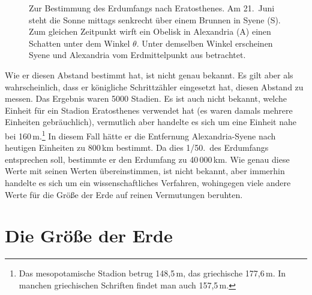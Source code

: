\begin{SCfigure}[30][htb]
\caption{\label{fig_Erat}%
Zur Bestimmung des Erdumfangs nach Eratosthenes. Am 21.\ Juni steht die Sonne
mittags senkrecht \"uber einem Brunnen in Syene (S). Zum gleichen Zeitpunkt wirft ein
Obelisk in Alexandria (A) einen Schatten unter dem Winkel $\theta$. Unter demselben
Winkel erscheinen Syene und Alexandria vom Erdmittelpunkt aus betrachtet.}
\end{SCfigure}  

Wie er diesen Abstand bestimmt hat, ist nicht genau bekannt. Es gilt aber als wahrscheinlich,
dass er k\"onigliche Schrittz\"ahler eingesetzt hat, diesen Abstand zu messen. Das Ergebnis
waren 5000 Stadien. Es ist auch nicht bekannt, welche Einheit f\"ur ein Stadion Eratosthenes
verwendet hat (es waren damals mehrere Einheiten gebr\"auchlich), vermutlich aber handelte
es sich um eine Einheit nahe bei 160\,m.\footnote{Das mesopotamische Stadion betrug 148,5\,m, das
griechische 177,6\,m. In manchen griechischen Schriften findet man auch 157,5\,m.} 
In diesem Fall h\"atte er die Entfernung Alexandria-Syene 
nach heutigen Einheiten zu 800\,km bestimmt. Da dies 1/50.\ des Erdumfangs entsprechen
soll, bestimmte er den Erdumfang zu 40\,000\,km. Wie genau diese Werte mit seinen Werten
\"ubereinstimmen, ist nicht bekannt, aber immerhin handelte es sich um ein wissenschaftliches
Verfahren, wohingegen viele andere Werte f\"ur die Gr\"o\ss e der Erde auf reinen Vermutungen beruhten. 

\section{Die Gr\"o\ss e der Erde}

